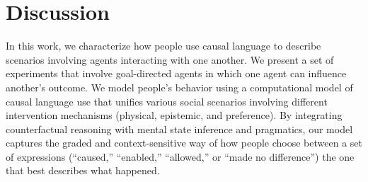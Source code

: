 \documentclass[10pt,letterpaper]{article}
\begin{document}
\section{Discussion}

% 
% 



In this work, we characterize how people use causal language to describe scenarios involving agents interacting with one another.
We present a set of experiments that involve goal-directed agents in which one agent can influence another's outcome.
We model people's behavior using a computational model of causal language use that unifies various social scenarios involving different intervention mechanisms (physical, epistemic, and preference).
By integrating counterfactual reasoning with mental state inference and pragmatics, our model captures the graded and context-sensitive way of how people choose between a set of expressions (``caused,'' ``enabled,'' ``allowed,'' or ``made no difference'') the one that best describes what happened.


\end{document}
